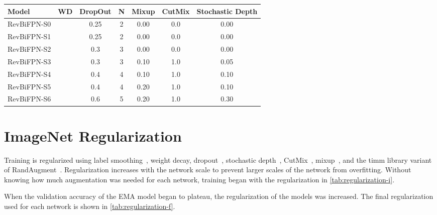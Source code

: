 \documentclass{article}
\begin{document}
\begin{table*}
    \caption{
    Weight decay (WD), dropout, number of RandAugment ops applied (N), mixup,  CutMix, and stochastic depth used at the end of training.
    Label smoothing uses a coefficient of 0.1 and RandAugment uses a magnitude of 9 and mstd of 0.5.
    }
    \vskip 10pt
    \centering
    \small
    \sc
    \begin{tabular}{lcccccc}
        \toprule
        Model         &               WD & DropOut &  N & Mixup & CutMix & Stochastic Depth \\ \midrule
        RevBiFPN-S0  &  & 0.25    &  2 &  0.00 &    0.0 &           0.00   \\
        RevBiFPN-S1  &  & 0.25    &  2 &  0.00 &    0.0 &           0.00   \\
        RevBiFPN-S2  &  & 0.3     &  3 &  0.00 &    0.0 &           0.00   \\
        RevBiFPN-S3  &  & 0.3     &  3 &  0.10 &    1.0 &           0.05   \\
        RevBiFPN-S4  &  & 0.4     &  4 &  0.10 &    1.0 &           0.10   \\
        RevBiFPN-S5  &  & 0.4     &  4 &  0.20 &    1.0 &           0.10   \\
        RevBiFPN-S6  &  & 0.6     &  5 &  0.20 &    1.0 &           0.30   \\
        \bottomrule
    \end{tabular}
    \label{tab:regularization-f}
\end{table*}


\section{ImageNet Regularization}
\label{appx:i1k_regularization}


Training is regularized using label smoothing~\cite{szegedy2016rethinking}, weight decay, dropout~\cite{srivastava2014dropout}, stochastic depth~\cite{huang2016deep}, CutMix~\cite{yun2019cutmix}, mixup~\cite{zhang2018mixup}, and the timm library \cite{wightman2019timm} variant of RandAugment~\cite{cubuk2020randaugment}.
Regularization increases with the network scale to prevent larger scales of the network from overfitting.
Without knowing how much augmentation was needed for each network, training began with the regularization in \cref{tab:regularization-i}.

When the validation accuracy of the EMA model began to plateau, the regularization of the models was increased. The final regularization used for each network is shown in \cref{tab:regularization-f}.
\end{document}
